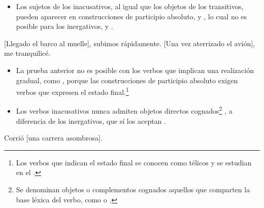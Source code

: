 \begin{itemize}
  \item Los sujetos de los inacusativos, al igual que los objetos de los
        transitivos, pueden aparecer en construcciones de participio absoluto,
         y , lo cual no es posible para
        los inergativos,  y .
\end{itemize}

\begin{exe}
  \ex\label{ex:07-barco} {}[Llegado el barco al muelle], subimos rápidamente.
  \ex\label{ex:07-avion} {}[Una vez aterrizado el avión], me tranquilicé.
\end{exe}

\begin{itemize}
  \item La prueba anterior no es posible con los verbos que implican una
        realización gradual, como , porque las
        construcciones de participio absoluto exigen verbos que expresen el
        estado final.\footnote{Los verbos que indican el estado final se conocen
        como télicos y se estudian en el .}
\end{itemize}

\begin{exe}
\end{exe}

\begin{itemize}
  \item Los verbos inacusativos nunca admiten objetos directos
        cognados\footnote{Se denominan objetos o complementos cognados aquellos
        que comparten la base léxica del verbo, como  o .} , a
        diferencia de los inergativos, que sí los aceptan .
\end{itemize}

\begin{exe}
  \ex\label{ex:07-carrera} Corrió [una carrera asombrosa].
\end{exe}

